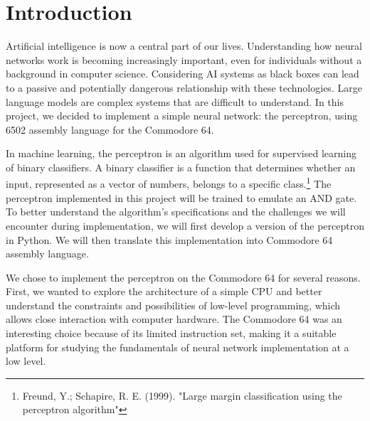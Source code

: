 
\section{Introduction}

Artificial intelligence is now a central part of our lives. Understanding how neural networks work is becoming increasingly important, even for individuals without a background in computer science. Considering AI systems as black boxes can lead to a passive and potentially dangerous relationship with these technologies.
Large language models are complex systems that are difficult to understand. In this project, we decided to implement a simple neural network: the perceptron, using 6502 assembly language for the Commodore 64.

In machine learning, the perceptron is an algorithm used for supervised learning of binary classifiers. A binary classifier is a function that determines whether an input, represented as a vector of numbers, belongs to a specific class.\footnote{Freund, Y.; Schapire, R. E. (1999). "Large margin classification using the perceptron algorithm"}
The perceptron implemented in this project will be trained to emulate an AND gate. To better understand the algorithm's specifications and the challenges we will encounter during implementation, we will first develop a version of the perceptron in Python. We will then translate this implementation into Commodore 64 assembly language.

We chose to implement the perceptron on the Commodore 64 for several reasons. First, we wanted to explore the architecture of a simple CPU and better understand the constraints and possibilities of low-level programming, which allows close interaction with computer hardware. The Commodore 64 was an interesting choice because of its limited instruction set, making it a suitable platform 
for studying the fundamentals of neural network implementation at a low level.


